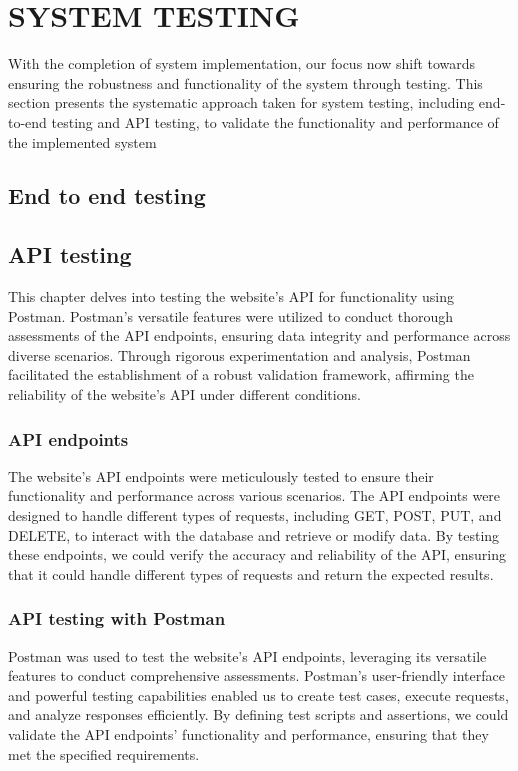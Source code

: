 \chapter{SYSTEM TESTING}

With the completion of system implementation, our focus now shift towards 
ensuring the robustness and functionality of the system through testing. 
This section presents the systematic approach taken for system testing, 
including end-to-end testing and API testing, to validate the functionality 
and performance of the implemented system

\section{End to end testing}


\section{API testing}
This chapter delves into testing the website's API for functionality using 
Postman. Postman's versatile features were utilized to conduct thorough 
assessments of the API endpoints, ensuring data integrity and performance 
across diverse scenarios. Through rigorous experimentation and analysis, 
Postman facilitated the establishment of a robust validation framework, 
affirming the reliability of the website's API under different conditions.

\subsection{API endpoints}
The website's API endpoints were meticulously tested to ensure their
functionality and performance across various scenarios. The API endpoints
were designed to handle different types of requests, including GET, POST,
PUT, and DELETE, to interact with the database and retrieve or modify
data. By testing these endpoints, we could verify the accuracy and
reliability of the API, ensuring that it could handle different types of
requests and return the expected results.

\subsection{API testing with Postman}
Postman was used to test the website's API endpoints, leveraging its
versatile features to conduct comprehensive assessments. Postman's
user-friendly interface and powerful testing capabilities enabled us to
create test cases, execute requests, and analyze responses efficiently.
By defining test scripts and assertions, we could validate the API
endpoints' functionality and performance, ensuring that they met the
specified requirements.

